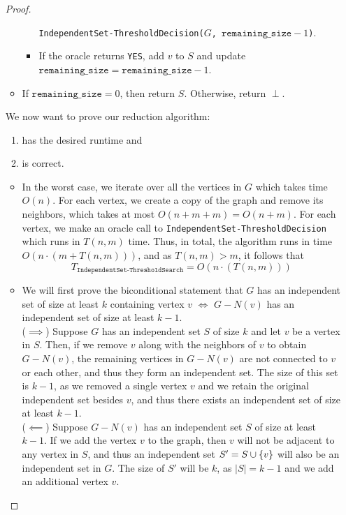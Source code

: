 \documentclass[11pt]{scrartcl}
\theoremstyle{dotlessP}
\theoremstyle{dotlessN}
\DeclarePairedDelimiter\set{\{}{\}}
\newcommand{\unite}{\cup}
\begin{document}
\begin{enumerate}[(a)]
\begin{proof}
\begin{itemize}
\begin{itemize}
						\texttt{IndependentSet-ThresholdDecision($G$, $\texttt{remaining\_size}-1$)}.
					\item If the oracle returns \texttt{YES}, add $v$ to $S$ and update $\texttt{remaining\_size} = \texttt{remaining\_size} - 1$.
				\end{itemize}
			\item If $\texttt{remaining\_size} = 0$, then return $S$. Otherwise, return $\perp$.
		\end{itemize}
		We now want to prove our reduction algorithm:
		\begin{enumerate}[1.]
			\item has the desired runtime and
			\item is correct.
		\end{enumerate}
		\begin{itemize}
			\item In the worst case, we iterate over all the vertices in $G$ which takes time $O(n)$. For each vertex, we create a copy of the graph and remove its neighbors, which takes at most  $O(n + m + m) = O(n + m)$. For each vertex, we make an oracle call to \texttt{IndependentSet-ThresholdDecision} which runs in  $T(n,m)$ time. Thus, in total, the algorithm runs in time $O(n\cdot(m + T(n, m)))$, and as  $T(n,m) > m$, it follows that
				\[
					T_\texttt{IndependentSet-ThresholdSearch} = O(n\cdot(T(n,m)))
				\] 

	\item We will first prove the biconditional statement that $G$ has an independent set of size at least $k$  containing vertex $v$ $\iff$ $G - N(v)$ has an independent set of size at least $k-1$.
		\\

		($\implies$) Suppose $G$ has an independent set $S$ of size $k$ and let $v$ be a vertex in $S$. Then, if we remove $v$ along with the neighbors of $v$ to obtain $G - N(v)$, the remaining vertices in $G-N(v)$ are not connected to $v$ or each other, and thus they form an independent set. The size of this set is $k-1$, as we removed  a single vertex $v$ and we retain the original independent set besides $v$, and thus there exists an independent set of size at least $k-1$.
		\\

		($\impliedby$) Suppose $G - N(v)$ has an independent set $S$ of size at least $k-1$. If we add the vertex $v$ to the graph, then  $v$ will not be adjacent to any vertex in $S$, and thus an independent set $S' = S \unite \set*{v}$ will also be an independent set in $G$. The size of $S'$ will be $k$, as $|S| = k-1$ and we add an additional vertex $v$.
		\\


\end{itemize}
\end{proof}
\end{enumerate}
\end{document}
